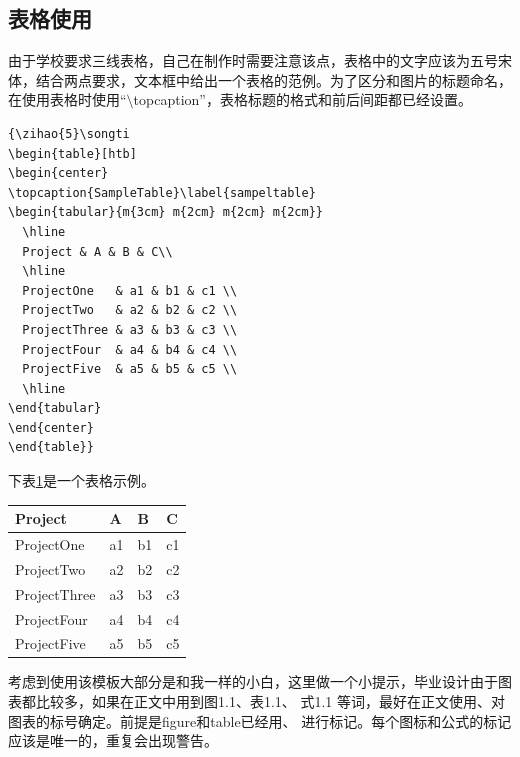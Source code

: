 {\begin{spacing}{1.5}
\newpage
\section{表格使用}
由于学校要求三线表格，自己在制作时需要注意该点，表格中的文字应该为五号宋体，结合两点要求，文本框中给出一个表格的范例。为了区分和图片的标题命名，在使用表格时使用“$\setminus$topcaption”，表格标题的格式和前后间距都已经设置。

\vspace{-4ex}
\begin{lstlisting}
{\zihao{5}\songti
\begin{table}[htb]
\begin{center}
\topcaption{SampleTable}\label{sampeltable}
\begin{tabular}{m{3cm} m{2cm} m{2cm} m{2cm}}
  \hline
  Project & A & B & C\\
  \hline
  ProjectOne   & a1 & b1 & c1 \\
  ProjectTwo   & a2 & b2 & c2 \\
  ProjectThree & a3 & b3 & c3 \\
  ProjectFour  & a4 & b4 & c4 \\
  ProjectFive  & a5 & b5 & c5 \\
  \hline
\end{tabular}
\end{center}
\end{table}}
\end{lstlisting}
\vspace{-2ex}

下表\ref{sampeltable}是一个表格示例。

{\wuhao\songti
\begin{table}[htb]
\begin{center}
\label{sampeltable}
\begin{tabular}{m{3cm} m{2cm} m{2cm} m{2cm}}
  \hline
  Project & A & B & C\\
  \hline
  ProjectOne& a1 & b1 & c1 \\
  ProjectTwo & a2 & b2 & c2 \\
  ProjectThree & a3 & b3 & c3 \\
  ProjectFour& a4 & b4 & c4 \\
  ProjectFive & a5& b5 & c5 \\
  \hline
\end{tabular}
\end{center}
\end{table}}

考虑到使用该模板大部分是和我一样的小白，这里做一个小提示，毕业设计由于图表都比较多，如果在正文中用到图1.1、表1.1、 式1.1 等词，最好在正文使用、对图表的标号确定。前提是figure和table已经用、 进行标记。每个图标和公式的标记应该是唯一的，重复会出现警告。


\end{spacing}}
